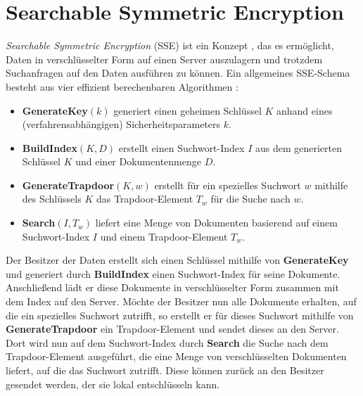 \section{Searchable Symmetric Encryption}

\label{sec_basisc_se}


\textit{Searchable Symmetric Encryption} (SSE) ist ein Konzept , das es ermöglicht, Daten in verschlüsselter Form auf einen Server auszulagern und trotzdem Suchanfragen auf den Daten ausführen zu können. Ein allgemeines SSE-Schema besteht aus vier effizient berechenbaren Algorithmen \cite{wang2016}:

\begin{itemize}
  \item \textbf{GenerateKey}\((k)\) generiert einen geheimen Schlüssel \(K\) anhand eines (verfahrensabhängigen) Sicherheitsparameters \(k\).
  \item \textbf{BuildIndex}\((K, D)\) erstellt einen Suchwort-Index \(I\) aus dem generierten Schlüssel \(K\) und einer Dokumentenmenge \(D\).
  \item \textbf{GenerateTrapdoor}\((K, w)\) erstellt für ein spezielles Suchwort \(w\) mithilfe des Schlüssels \(K\) das Trapdoor-Element \(T_w\) für die Suche nach \(w\).
  \item \textbf{Search}\((I, T_w)\) liefert eine Menge von Dokumenten basierend auf einem Suchwort-Index \(I\) und einem Trapdoor-Element \(T_w\).
\end{itemize}

Der Besitzer der Daten erstellt sich einen Schlüssel mithilfe von \textbf{GenerateKey} und generiert durch \textbf{BuildIndex} einen Suchwort-Index für seine Dokumente. Anschließend lädt er diese Dokumente in verschlüsselter Form zusammen mit dem Index auf den Server. Möchte der Besitzer nun alle Dokumente erhalten, auf die ein spezielles Suchwort zutrifft, so erstellt er für dieses Suchwort mithilfe von \textbf{GenerateTrapdoor} ein Trapdoor-Element und sendet dieses an den Server. Dort wird nun auf dem Suchwort-Index durch \textbf{Search} die Suche nach dem Trapdoor-Element ausgeführt, die eine Menge von verschlüsselten Dokumenten liefert, auf die das Suchwort zutrifft. Diese können zurück an den Besitzer gesendet werden, der sie lokal entschlüsseln kann. 